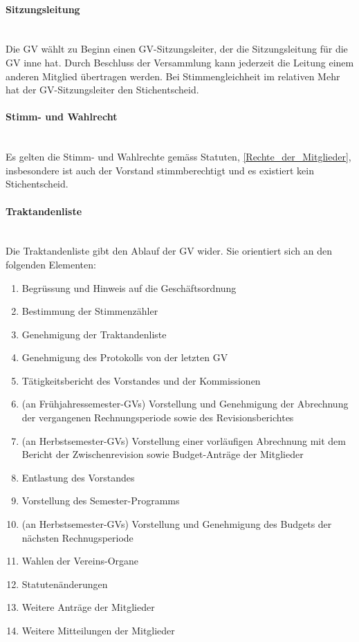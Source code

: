 \documentclass[a4paper,11pt]{article}
\begin{document}
\paragraph{Sitzungsleitung} \ \\
Die GV wählt zu Beginn einen GV-Sitzungsleiter, der die Sitzungsleitung für die GV inne hat. Durch Beschluss der Versammlung kann jederzeit die Leitung einem anderen Mitglied übertragen werden. Bei Stimmengleichheit im relativen Mehr hat der GV-Sitzungsleiter den Stichentscheid. %


\paragraph{Stimm- und Wahlrecht} \ \\
Es gelten die Stimm- und Wahlrechte gemäss Statuten, \ref{Rechte_der_Mitglieder}, insbesondere ist auch der Vorstand stimmberechtigt und es existiert kein Stichentscheid. %


\paragraph{Traktandenliste} \ \\
Die Traktandenliste gibt den Ablauf der GV wider. Sie orientiert sich an den folgenden Elementen:
\begin{enumerate}
  \item Begrüssung und Hinweis auf die Geschäftsordnung
  \item Bestimmung der Stimmenzähler
  \item Genehmigung der Traktandenliste
  \item Genehmigung des Protokolls von der letzten GV
  \item Tätigkeitsbericht des Vorstandes und der Kommissionen
  \item (an Frühjahressemester-GVs) Vorstellung und Genehmigung der Abrechnung der vergangenen Rechnungsperiode sowie des Revisionsberichtes
  \item (an Herbstsemester-GVs) Vorstellung einer vorläufigen Abrechnung mit dem Bericht der Zwischenrevision sowie Budget-Anträge der Mitglieder
  \item Entlastung des Vorstandes
  \item Vorstellung des Semester-Programms
  \item (an Herbstsemester-GVs) Vorstellung und Genehmigung des Budgets der nächsten Rechnugsperiode
  \item Wahlen der Vereins-Organe
  \item Statutenänderungen
  \item Weitere Anträge der Mitglieder
  \item Weitere Mitteilungen der Mitglieder
\end{enumerate}
\end{document}
